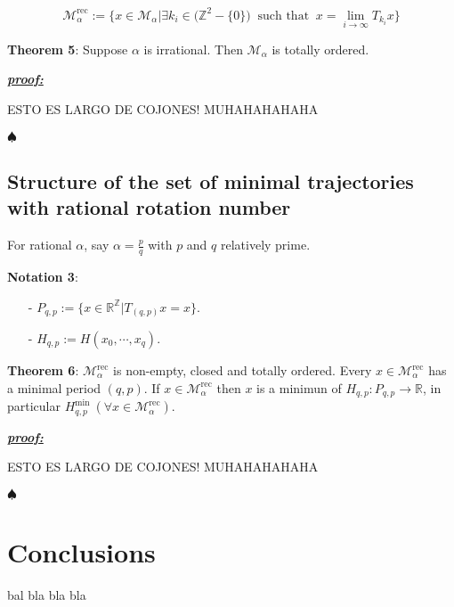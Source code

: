 \documentclass{article}
\begin{document}
	$$
		\mathcal{M}_{\alpha}^{\text{rec}} := \{ x \in \mathcal{M}_{\alpha} | \exists k_i \in \big( \mathbb{Z}^{2} - \{ 0 \}       \big) \ \text{ such that } \ x = \lim_{i \rightarrow \infty } T_{k_i} x \}
	$$
	
	
\noindent \textbf{Theorem 5}: Suppose $\alpha$ is irrational. Then $\mathcal{M}_{\alpha}$ is totally ordered.


\color{blue}
	\noindent \underline{\textbf{\textit{proof:}}} 		

	ESTO ES LARGO DE COJONES! MUHAHAHAHAHA
	
	\noindent $\spadesuit$
\color{black}


\subsection{Structure of the set of minimal trajectories with rational rotation number}


\noindent For rational $\alpha$, say $\alpha = \frac{p}{q}$ with $p$ and $q$ relatively prime. 


\noindent \textbf{Notation 3}: 
	\begin{itemize}
		\item[-] $P_{q, p} := \{ x \in \mathbb{R}^{\mathbb{Z}} | T_{(q, p)} x = x \}$.
		\item[-] $H_{q, p} := H(x_0, \cdots, x_q)$.
	\end{itemize}


\noindent \textbf{Theorem 6}: $\mathcal{M}_{\alpha}^{\text{rec}}$ is non-empty, closed and totally ordered. Every $x \in \mathcal{M}_{\alpha}^{\text{rec}}$ has a minimal period $(q, p)$. If $x \in \mathcal{M}_{\alpha}^{\text{rec}}$ then $x$ is a minimun of $H_{q, p}: P_{q, p} \rightarrow \mathbb{R}$, in particular $H_{q, p}^{\text{min}} \ (\forall x \in \mathcal{M}_{\alpha}^{\text{rec}} )$.


\color{blue}
	\noindent \underline{\textbf{\textit{proof:}}} 		

	ESTO ES LARGO DE COJONES! MUHAHAHAHAHA
	
	\noindent $\spadesuit$
\color{black}


		
\section{Conclusions}
		
\cite{R1}





\newpage		
\begin{thebibliography}{X}
 bal bla bla bla
\end{thebibliography}
		
		
		
		
		
		
		
		
		
		
		
		

	
	
\end{document}
